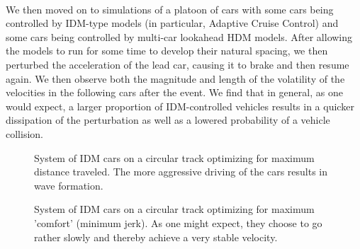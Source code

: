 \documentclass[12pt]{article}
\begin{document}
\paragraph{}We then moved on to simulations of a platoon of cars with some cars being controlled by IDM-type models (in particular, Adaptive Cruise Control) and some cars being controlled by multi-car lookahead HDM models. After allowing the models to run for some time to develop their natural spacing, we then perturbed the acceleration of the lead car, causing it to brake and then resume again. We then observe both the magnitude and length of the volatility of the velocities in the following cars after the event. We find that in general, as one would expect, a larger proportion of IDM-controlled vehicles results in a quicker dissipation of the perturbation as well as a lowered probability of a vehicle collision.\\
\begin{figure}[H]
  \centering
  \caption{System of IDM cars on a circular track optimizing for maximum distance traveled. The more aggressive driving of the cars results in wave formation.}
\end{figure}

\begin{figure}[H]
  \centering
  \caption{System of IDM cars on a circular track optimizing for maximum 'comfort' (minimum jerk). As one might expect, they choose to go rather slowly and thereby achieve a very stable velocity.}
\end{figure}
\end{document}
